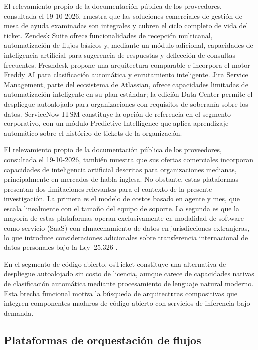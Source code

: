 El relevamiento propio de la documentación pública de los proveedores, consultada el 19-10-2026, muestra que las soluciones comerciales de gestión de mesa de ayuda examinadas son integrales y cubren el ciclo completo de vida del ticket. Zendesk Suite ofrece funcionalidades de recepción multicanal, automatización de flujos básicos y, mediante un módulo adicional, capacidades de inteligencia artificial para sugerencia de respuestas y deflección de consultas frecuentes. Freshdesk propone una arquitectura comparable e incorpora el motor Freddy AI para clasificación automática y enrutamiento inteligente. Jira Service Management, parte del ecosistema de Atlassian, ofrece capacidades limitadas de automatización inteligente en su plan estándar; la edición Data Center permite el despliegue autoalojado para organizaciones con requisitos de soberanía sobre los datos. ServiceNow ITSM constituye la opción de referencia en el segmento corporativo, con un módulo Predictive Intelligence que aplica aprendizaje automático sobre el histórico de tickets de la organización.

El relevamiento propio de la documentación pública de los proveedores, consultada el 19-10-2026, también muestra que sus ofertas comerciales incorporan capacidades de inteligencia artificial descritas para organizaciones medianas, principalmente en mercados de habla inglesa. No obstante, estas plataformas presentan dos limitaciones relevantes para el contexto de la presente investigación. La primera es el modelo de costos basado en agente y mes, que escala linealmente con el tamaño del equipo de soporte. La segunda es que la mayoría de estas plataformas operan exclusivamente en modalidad de software como servicio (SaaS) con almacenamiento de datos en jurisdicciones extranjeras, lo que introduce consideraciones adicionales sobre transferencia internacional de datos personales bajo la Ley~25.326 \parencite{Ley25326_2000}.

En el segmento de código abierto, osTicket constituye una alternativa de despliegue autoalojado sin costo de licencia, aunque carece de capacidades nativas de clasificación automática mediante procesamiento de lenguaje natural moderno. Esta brecha funcional motiva la búsqueda de arquitecturas compositivas que integren componentes maduros de código abierto con servicios de inferencia bajo demanda.

\subsection{Plataformas de orquestación de flujos}\label{subsec:plataformas-orquestacion}

